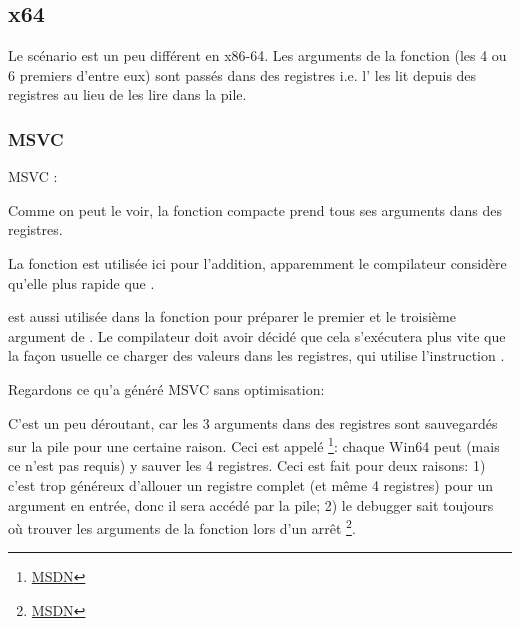 \subsection{x64}


Le scénario est un peu différent en x86-64. Les arguments de la fonction (les 4 ou
6 premiers d'entre eux) sont passés dans des registres i.e. l'
les lit depuis des registres au lieu de les lire dans la pile.

\subsubsection{MSVC}

MSVC \Optimizing:



Comme on peut le voir, la fonction compacte \ttf prend tous ses arguments dans des registres.

La fonction \LEA est utilisée ici pour l'addition,
apparemment le compilateur considère qu'elle plus rapide que .

\LEA est aussi utilisée dans la fonction \main pour préparer le premier et le troisième
argument de \ttf. Le compilateur doit avoir décidé que cela s'exécutera plus vite
que la façon usuelle ce charger des valeurs dans les registres, qui utilise l'instruction
\MOV.

Regardons ce qu'a généré MSVC sans optimisation:



C'est un peu déroutant, car les 3 arguments dans des registres sont sauvegardés
sur la pile pour une certaine raison.
\label{shadow_space}
Ceci est appelé  %
\footnote{\href{http://msdn.microsoft.com/en-us/library/zthk2dkh(v=vs.80).aspx}{MSDN}}: 
chaque Win64 peut (mais ce n'est pas requis) y sauver les 4 registres. %
Ceci est fait pour deux raisons:
1) c'est trop généreux d'allouer un registre complet (et même 4 registres) pour
un argument en entrée, donc il sera accédé par la pile;
2) le debugger sait toujours où trouver les arguments de la fonction lors d'un arrêt
\footnote{\href{http://msdn.microsoft.com/en-us/library/ew5tede7(v=VS.90).aspx}{MSDN}}.

